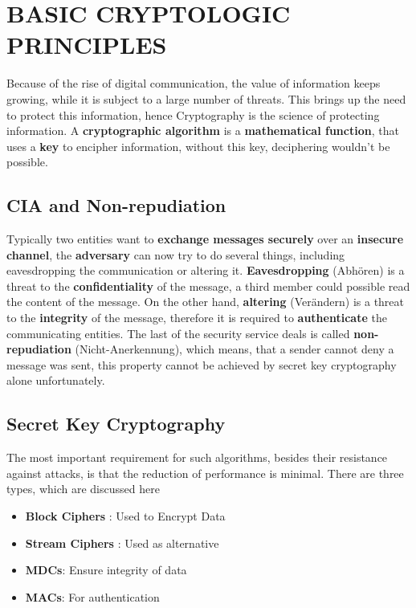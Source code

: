 \documentclass[a4paper, 10 pt, conference]{ieeeconf}
\begin{document}
\pagebreak



\section{\textbf{BASIC CRYPTOLOGIC PRINCIPLES}}
Because of the rise of digital communication, the value of information keeps growing, while it is subject to a large number of threats. 
This brings up the need to protect this information, hence Cryptography is the science of protecting information. 
A \textbf{cryptographic algorithm} is a \textbf{mathematical function}, that uses a \textbf{key} to encipher information, without this key, deciphering wouldn't be possible. 
\subsection{\textbf{CIA and Non-repudiation}}
Typically two entities want to \textbf{exchange messages securely} over an \textbf{insecure channel}, the \textbf{adversary} can now try to do several things, including eavesdropping the communication or altering it. 
\textbf{Eavesdropping} (Abhören) is a threat to the \textbf{confidentiality} of the message, a third member could possible read the content of the message. 
On the other hand, \textbf{altering} (Verändern) is a threat to the \textbf{integrity} of the message, therefore it is required to \textbf{authenticate} the communicating entities. 
The last of the security service deals is called \textbf{non-repudiation} (Nicht-Anerkennung), which means, that a sender cannot deny a message was sent, this property cannot be achieved by secret key cryptography alone unfortunately. 

\subsection{\textbf{Secret Key Cryptography}}
The most important requirement for such algorithms, besides their resistance against attacks, is that the reduction of performance is minimal. There are three types, which are discussed here
\begin{itemize}
\item \textbf{Block Ciphers} : Used to Encrypt Data
\item \textbf{Stream Ciphers} : Used as alternative
\item \textbf{MDCs}: Ensure integrity of data
\item \textbf{MACs}: For authentication
\end{itemize}
\end{document}
